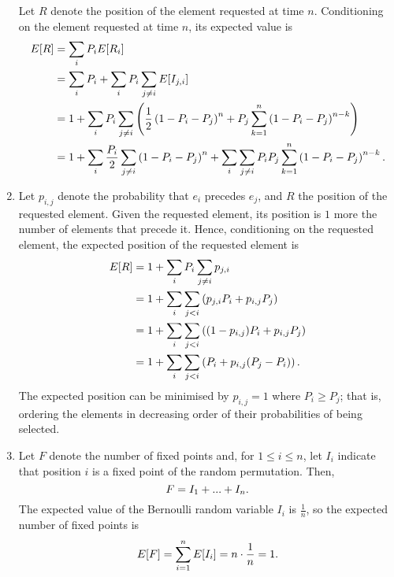 \documentclass{article}
\begin{document}
\begin{enumerate}
    Let $R$ denote the position of the element requested at time $n$.
    Conditioning on the element requested at time $n$, its expected value is
    \[\begin{split}
    E[R]    & = \sum_i P_i E[R_i] \\
            & = \sum_i P_i + \sum_i P_i \sum_{j\neq i}E[I_{j,i}] \\
            & = 1 + \sum_i P_i \sum_{j\neq i} \left( \frac{1}{2}\left(1-P_i-P_j\right)^n + P_j\sum_{k=1}^n \left(1-P_i-P_j\right)^{n-k} \right) \\
            & = 1 + \sum_i  \frac{P_i}{2} \sum_{j\neq i}  \left(1-P_i-P_j\right)^n 
                        + \sum_i \sum_{j\neq i}  P_i P_j \sum_{k=1}^n \left(1-P_i-P_j\right)^{n-k}  \text. \\
    \end{split}\]
\item
    Let $p_{i,j}$ denote the probability that $e_i$ precedes $e_j$, and $R$ the position of the requested element.
    Given the requested element, its position is $1$ more the number of elements that precede it.
    Hence, conditioning on the requested element, the expected position of the requested element is
    \[\begin{split}
    E[R]    & = 1 + \sum_iP_i \sum_{j\neq i} p_{j,i} \\
            & = 1 + \sum_i\sum_{j<i} \left( p_{j,i}P_i + p_{i,j}P_j \right) \\
            & = 1 + \sum_i\sum_{j<i} \left( (1-p_{i,j})P_i + p_{i,j}P_j \right) \\
            & = 1 + \sum_i\sum_{j<i} \left( P_i + p_{i,j}( P_j-P_i ) \right) \text. \\
    \end{split}\]
    The expected position can be minimised by $p_{i,j}=1$ where $P_i\geq P_j$; that is, ordering the elements in
    decreasing order of their probabilities of being selected.
\item
    Let $F$ denote the number of fixed points
    and, for $1 \leq i \leq n$, let $I_i$ indicate that position $i$ is a fixed point of the random permutation.
    Then,
    \[ F = I_1 + ... + I_n \text. \]
    The expected value of the Bernoulli random variable $I_i$ is $\frac{1}{n}$, so the expected number of fixed points is
    \[ E[F] = \sum_{i=1}^nE[I_i] = n\cdot\frac{1}{n} = 1 \text. \]


\end{enumerate}
\end{document}
